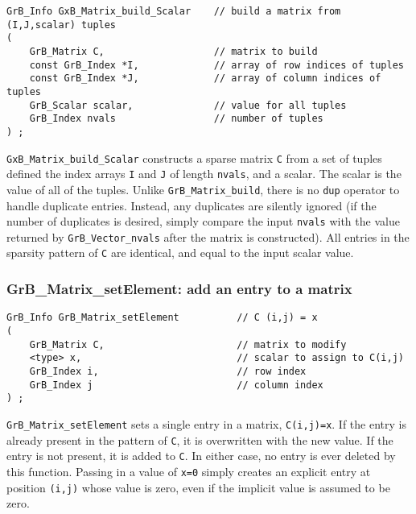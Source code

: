 \documentclass[12pt]{article}
\begin{document}
{\begin{mdframed}[userdefinedwidth=6in]
{\footnotesize
\begin{verbatim}
GrB_Info GxB_Matrix_build_Scalar    // build a matrix from (I,J,scalar) tuples
(
    GrB_Matrix C,                   // matrix to build
    const GrB_Index *I,             // array of row indices of tuples
    const GrB_Index *J,             // array of column indices of tuples
    GrB_Scalar scalar,              // value for all tuples
    GrB_Index nvals                 // number of tuples
) ;
\end{verbatim} } \end{mdframed}

\verb'GxB_Matrix_build_Scalar' constructs a sparse matrix \verb'C' from a set
of tuples defined the index arrays \verb'I' and \verb'J' of length
\verb'nvals', and a scalar.  The scalar is the value of all of the tuples.
Unlike \verb'GrB_Matrix_build', there is no \verb'dup' operator to handle
duplicate entries.  Instead, any duplicates are silently ignored (if the number
of duplicates is desired, simply compare the input \verb'nvals' with the value
returned by \verb'GrB_Vector_nvals' after the matrix is constructed).  All
entries in the sparsity pattern of \verb'C' are identical, and equal to the
input scalar value.

\subsubsection{{\sf GrB\_Matrix\_setElement:}   add an entry to a matrix}
\label{matrix_setElement}

\begin{mdframed}[userdefinedwidth=6in]
{\footnotesize
\begin{verbatim}
GrB_Info GrB_Matrix_setElement          // C (i,j) = x
(
    GrB_Matrix C,                       // matrix to modify
    <type> x,                           // scalar to assign to C(i,j)
    GrB_Index i,                        // row index
    GrB_Index j                         // column index
) ;
\end{verbatim} } \end{mdframed}

\verb'GrB_Matrix_setElement' sets a single entry in a matrix, \verb'C(i,j)=x'.
If the entry is already present in the pattern of \verb'C', it is overwritten
with the new value.  If the entry is not present, it is added to \verb'C'.  In
either case, no entry is ever deleted by this function.  Passing in a value of
\verb'x=0' simply creates an explicit entry at position \verb'(i,j)' whose
value is zero, even if the implicit value is assumed to be zero.

}
\end{document}
